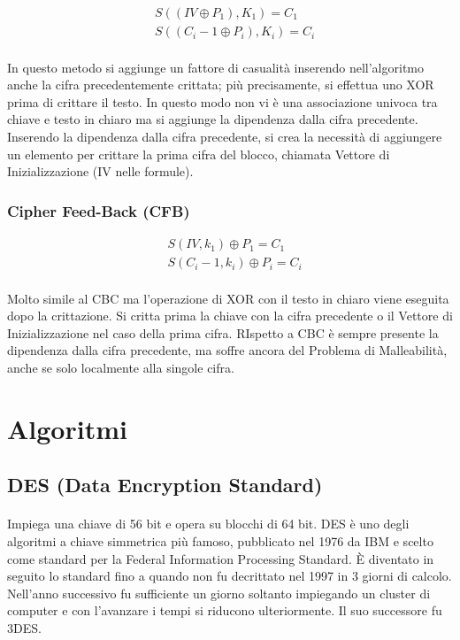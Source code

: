\documentclass{article}
\begin{document}
			\begin{align*}
				&S((IV \oplus P_1), K_1) = C_1\\
				&S((C_i-1 \oplus P_i), K_i) = C_i
			\end{align*}
			\paragraph{}
			In questo metodo si aggiunge un fattore di casualità inserendo nell'algoritmo anche la cifra precedentemente crittata; più precisamente, si effettua uno XOR prima di crittare il testo. In questo modo non vi è una associazione univoca tra chiave e testo in chiaro ma si aggiunge la dipendenza dalla cifra precedente. Inserendo la dipendenza dalla cifra precedente, si crea la necessità di aggiungere un elemento per crittare la prima cifra del blocco, chiamata Vettore di Inizializzazione (IV nelle formule).

			\subsubsection{Cipher Feed-Back (CFB)}

				\begin{align*}
				&S(IV,k_1) \oplus P_1 = C_1\\
				&S(C_i-1,k_i) \oplus P_i = C_i
				\end{align*}
				\paragraph{}
				Molto simile al CBC ma l'operazione di XOR con il testo in chiaro viene eseguita dopo la crittazione. Si critta prima la chiave con la cifra precedente o il Vettore di Inizializzazione nel caso della prima cifra. RIspetto a CBC è sempre presente la dipendenza dalla cifra precedente, ma soffre ancora del Problema di Malleabilità, anche se solo localmente alla singole cifra.

	\section{Algoritmi}

		\subsection{DES (Data Encryption Standard)}

			\paragraph{}
			Impiega una chiave di 56 bit e opera su blocchi di 64 bit. DES è uno degli algoritmi a chiave simmetrica più famoso, pubblicato nel 1976 da IBM e scelto come standard per la Federal Information Processing Standard. È diventato in seguito lo standard fino a quando non fu decrittato nel 1997 in 3 giorni di calcolo. Nell'anno successivo fu sufficiente un giorno soltanto impiegando un cluster di computer e con l'avanzare i tempi si riducono ulteriormente. Il suo successore fu 3DES.
\end{document}
